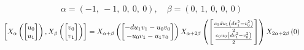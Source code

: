 \documentclass[11pt]{article}
\theoremstyle{definition}
\begin{document}
\[
\alpha = \left( -1, \  -1, \  0, \  0, \  0\right), \quad \beta = \left( 0, \  1, \  0, \  0, \  0\right)
\]
\[
\scaletoalign{\textwidth}{\left[ X_{\alpha}\left(\left[\begin{matrix}u_{0}\\u_{1}\end{matrix}\right]\right), X_{\beta}\left(\left[\begin{matrix}v_{0}\\v_{1}\end{matrix}\right]\right) \right] = X_{\alpha + \beta}\left(\left[\begin{matrix}- d u_{1} v_{1} - u_{0} v_{0}\\- u_{0} v_{1} - u_{1} v_{0}\end{matrix}\right]\right) X_{\alpha + 2\beta}\left(\left[\begin{matrix}\frac{c_{0} d u_{1} \left(d v_{1}^{2} - v_{0}^{2}\right)}{2}\\\frac{c_{0} u_{0} \left(d v_{1}^{2} - v_{0}^{2}\right)}{2}\end{matrix}\right]\right) X_{2\alpha + 2\beta}\left(0\right)}
\]
\end{document}
